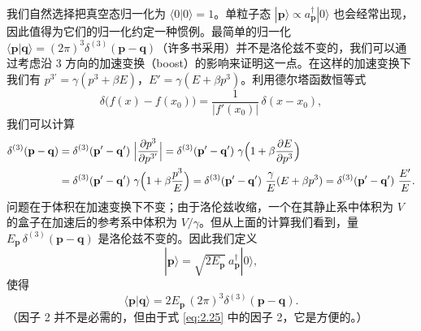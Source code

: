 我们自然选择把真空态归一化为 $\langle 0|0\rangle = 1$。单粒子态 $|\mathbf{p}\rangle \propto a_{\mathbf{p}}^\dagger|0\rangle$ 也会经常出现，因此值得为它们的归一化约定一种惯例。最简单的归一化 $\langle\mathbf{p}|\mathbf{q}\rangle = (2\pi)^3\delta^{(3)}(\mathbf{p}-\mathbf{q})$（许多书采用）并不是洛伦兹不变的，我们可以通过考虑沿 3 方向的加速变换（boost）的影响来证明这一点。在这样的加速变换下我们有 $p^{3'} = \gamma(p^3+\beta E)$，$E' = \gamma(E+\beta p^3)$。利用德尔塔函数恒等式
\begin{equation}
  \delta\bigl( f(x) - f(x_0) \bigr) =
    \frac{1}{|f'(x_0)|}\,\delta(x-x_0),
  \label{eq:2.34}
\end{equation}
我们可以计算
\begin{align}
  \delta^{(3)}(\mathbf{p}-\mathbf{q})
  &= \delta^{(3)}(\mathbf{p}'-\mathbf{q}')\
    \Bigl|\frac{\partial p^3}{\partial p^{3'}}\Bigr|
  = \delta^{(3)}(\mathbf{p}'-\mathbf{q}')\
    \gamma\Bigl(1+\beta\frac{\partial E}{\partial p^3}\Bigr)\\
  &= \delta^{(3)}(\mathbf{p}'-\mathbf{q}')\
    \gamma\Bigl(1+\beta\frac{p^3}{E}\Bigr)
  = \delta^{(3)}(\mathbf{p}'-\mathbf{q}')\
    \frac{\gamma}{E}(E+\beta p^3)
  = \delta^{(3)}(\mathbf{p}'-\mathbf{q}')\ \frac{E'}{E} .
\end{align}
问题在于体积在加速变换下不变；由于洛伦兹收缩，一个在其静止系中体积为 $V$ 的盒子在加速后的参考系中体积为 $V/\gamma$。但从上面的计算我们看到，量 $E_{\mathbf{p}}\,\delta^{(3)}(\mathbf{p}-\mathbf{q})$ 是洛伦兹不变的。因此我们定义
\begin{equation}
  |\mathbf{p}\rangle = \sqrt{2E_{\mathbf{p}}}\ a_{\mathbf{p}}^\dagger |0\rangle,
  \label{eq:2.35}
\end{equation}
使得
\begin{equation}
  \langle\mathbf{p}|\mathbf{q}\rangle
    = 2E_{\mathbf{p}}\,(2\pi)^3\delta^{(3)}(\mathbf{p}-\mathbf{q}).
  \label{eq:2.36}
\end{equation}
（因子 2 并不是必需的，但由于式 \eqref{eq:2.25} 中的因子 2，它是方便的。）

